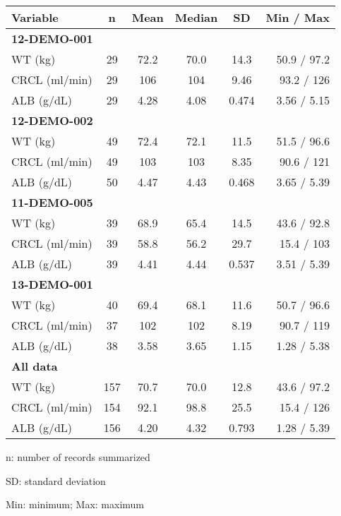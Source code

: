 \setlength{\tabcolsep}{5pt} 
\begin{threeparttable}
\renewcommand{\arraystretch}{1.3}
\begin{tabular}[h]{lccccr}
\hline
Variable & n & Mean & Median & SD & Min / Max \\
\hline
\multicolumn{6}{l}{\textbf{12-DEMO-001}}\\%
WT (kg) & 29 & 72.2 & 70.0 & 14.3 & 50.9 / 97.2 \\
CRCL (ml/min) & 29 & 106 & 104 & 9.46 & 93.2 / 126 \\
ALB (g/dL) & 29 & 4.28 & 4.08 & 0.474 & 3.56 / 5.15 \\
\hline \multicolumn{6}{l}{\textbf{12-DEMO-002}}\\%
WT (kg) & 49 & 72.4 & 72.1 & 11.5 & 51.5 / 96.6 \\
CRCL (ml/min) & 49 & 103 & 103 & 8.35 & 90.6 / 121 \\
ALB (g/dL) & 50 & 4.47 & 4.43 & 0.468 & 3.65 / 5.39 \\
\hline \multicolumn{6}{l}{\textbf{11-DEMO-005}}\\%
WT (kg) & 39 & 68.9 & 65.4 & 14.5 & 43.6 / 92.8 \\
CRCL (ml/min) & 39 & 58.8 & 56.2 & 29.7 & 15.4 / 103 \\
ALB (g/dL) & 39 & 4.41 & 4.44 & 0.537 & 3.51 / 5.39 \\
\hline \multicolumn{6}{l}{\textbf{13-DEMO-001}}\\%
WT (kg) & 40 & 69.4 & 68.1 & 11.6 & 50.7 / 96.6 \\
CRCL (ml/min) & 37 & 102 & 102 & 8.19 & 90.7 / 119 \\
ALB (g/dL) & 38 & 3.58 & 3.65 & 1.15 & 1.28 / 5.38 \\
\hline \multicolumn{6}{l}{\textbf{All data}}\\%
WT (kg) & 157 & 70.7 & 70.0 & 12.8 & 43.6 / 97.2 \\
CRCL (ml/min) & 154 & 92.1 & 98.8 & 25.5 & 15.4 / 126 \\
ALB (g/dL) & 156 & 4.20 & 4.32 & 0.793 & 1.28 / 5.39 \\
\hline
\end{tabular}
\begin{tablenotes}[flushleft]
\item n: number of records summarized
\item SD: standard deviation
\item Min: minimum; Max: maximum
\end{tablenotes}
\end{threeparttable}

